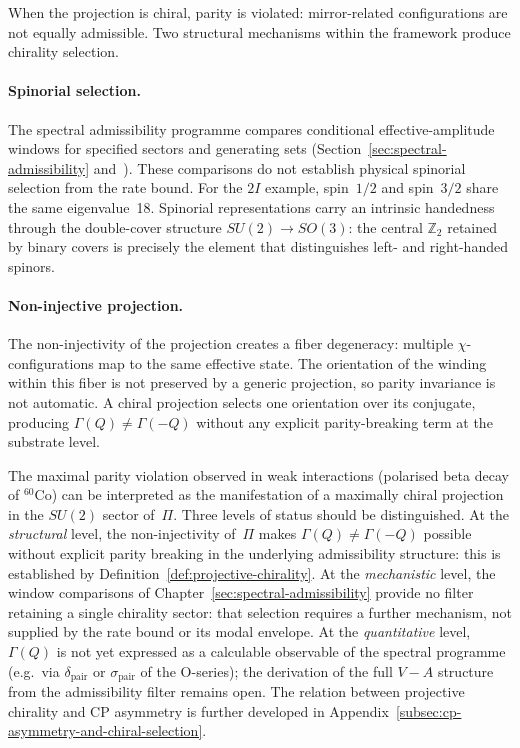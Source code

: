     When the projection is chiral, parity is violated: mirror-related
    configurations are not equally admissible.
    Two structural mechanisms within the framework produce chirality selection.

    \paragraph{Spinorial selection.}
      The spectral admissibility programme compares conditional effective-amplitude windows
      for specified sectors and generating sets (Section~\ref{sec:spectral-admissibility}
      and~\cite{Beau2026a1}).
      These comparisons do not establish physical spinorial selection from the rate bound.
      For the $2I$ example, spin~$1/2$ and spin~$3/2$ share the same eigenvalue~18.
      Spinorial representations carry an intrinsic handedness through the
      double-cover structure $SU(2) \to SO(3)$: the central $\mathbb{Z}_2$
      retained by binary covers is precisely the element that distinguishes
      left- and right-handed spinors.

    \paragraph{Non-injective projection.}
      The non-injectivity of the projection creates a fiber degeneracy:
      multiple $\chi$-configurations map to the same effective state.
      The orientation of the winding within this fiber is not preserved by a
      generic projection, so parity invariance is not automatic.
      A chiral projection selects one orientation over its conjugate, producing
      $\Gamma(Q) \neq \Gamma(-Q)$ without any explicit parity-breaking term at
      the substrate level.

      The maximal parity violation observed in weak interactions (polarised beta
      decay of ${}^{60}\mathrm{Co}$) can be interpreted as the manifestation of a
      maximally chiral projection in the $SU(2)$ sector of~$\Pi$.
      Three levels of status should be distinguished.
      At the \emph{structural} level, the non-injectivity of~$\Pi$ makes
      $\Gamma(Q) \neq \Gamma(-Q)$ possible without explicit parity breaking
      in the underlying admissibility structure: this is established by
      Definition~\ref{def:projective-chirality}.
      At the \emph{mechanistic} level, the window comparisons of
      Chapter~\ref{sec:spectral-admissibility} provide no filter retaining a single chirality sector:
      that selection requires a further mechanism, not supplied by the rate bound or its modal envelope.
      At the \emph{quantitative} level, $\Gamma(Q)$ is not yet expressed as a
      calculable observable of the spectral programme (e.g.\ via
      $\delta_{\mathrm{pair}}$ or $\sigma_{\mathrm{pair}}$ of the O-series);
      the derivation of the full $V{-}A$ structure from the admissibility filter
      remains open.
      The relation between projective chirality and CP asymmetry is further
      developed in Appendix~\ref{subsec:cp-asymmetry-and-chiral-selection}.

